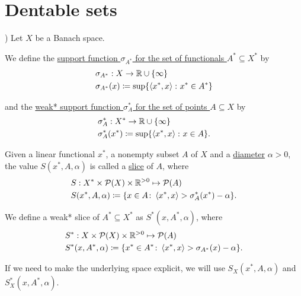 \section{Dentable sets}\label{sec:dentable_sets}

\begin{definition}\cite[Example 3.2(a]{Phelps1993})
  \label{def:banach_support_function}
  Let $X$ be a Banach space.

  We define the \ul{support function $\sigma_{A^*}$ for the set of functionals $A^* \subseteq X^*$} by
  \begin{align*}
    &\sigma_{A^*}: X \to \mathbb R \cup \{ \infty \} \\
    &\sigma_{A^*}(x) \coloneqq \sup \{ \left\langle x^*, x \right\rangle \colon x^* \in A^* \}
  \end{align*}

  and the \ul{weak* support function $\sigma^*_A$ for the set of points $A \subseteq X$} by
  \begin{align*}
    &\sigma^*_A: X^* \to \mathbb R \cup \{ \infty \} \\
    &\sigma^*_A(x^*) \coloneqq \sup \{ \left\langle x^*, x \right\rangle \colon x \in A \}.
  \end{align*}
\end{definition}

\begin{definition}\cite[definition 2.17]{Phelps1993}
  \label{def:banach_slice}
  Given a linear functional $x^*$, a nonempty subset $A$ of $X$ and a \ul{diameter} $\alpha > 0$, the value $S(x^*, A, \alpha)$ is called a \ul{slice} of $A$, where
  \begin{align*}
    &S: X^* \times \operatorname{\mathcal P}(X) \times \mathbb R^{>0} \mapsto \operatorname{\mathcal P}(A) \\
    &S(x^*, A, \alpha) \coloneqq \{ x \in A \colon \left\langle x^*, x \right\rangle > \sigma_A^*(x^*) - \alpha \}.
  \end{align*}

  We define a weak* slice of $A^* \subseteq X^*$ as $S^*(x, A^*, \alpha)$, where
  \begin{align*}
    &S^*: X \times \operatorname{\mathcal P}(X) \times \mathbb R^{>0} \mapsto \operatorname{\mathcal P}(A) \\
    &S^*(x, A^*, \alpha) \coloneqq \{ x^* \in A^* \colon \left\langle x^*, x \right\rangle > \sigma_{A^*}(x) - \alpha \}.
  \end{align*}

  If we need to make the underlying space explicit, we will use $S_X(x^*, A, \alpha)$ and $S_X^*(x, A^*, \alpha)$.
\end{definition}

